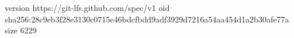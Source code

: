version https://git-lfs.github.com/spec/v1
oid sha256:28c9eb3f28e3130c0715e46bdcfbdd9adf3929d7216a54aa454d1a2b30afe77a
size 6229
